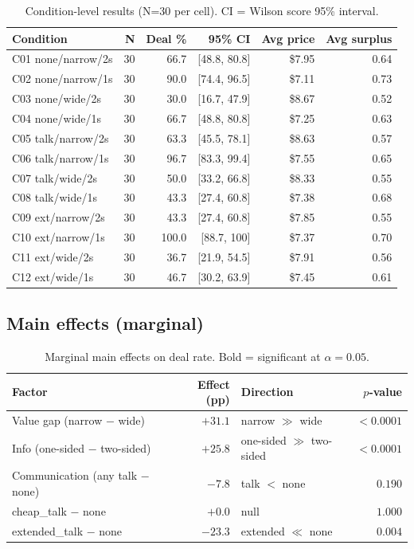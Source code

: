 \documentclass[11pt]{article}
\begin{document}
\begin{table}[htbp]
\centering
\small
\begin{tabularx}{\textwidth}{@{}l r r r r r@{}}
\toprule
\textbf{Condition} & \textbf{N} & \textbf{Deal \%} & \textbf{95\% CI} & \textbf{Avg price} & \textbf{Avg surplus} \\
\midrule
C01 none/narrow/2s & 30 & 66.7 & [48.8, 80.8] & \$7.95 & 0.64 \\
C02 none/narrow/1s & 30 & 90.0 & [74.4, 96.5] & \$7.11 & 0.73 \\
C03 none/wide/2s & 30 & 30.0 & [16.7, 47.9] & \$8.67 & 0.52 \\
C04 none/wide/1s & 30 & 66.7 & [48.8, 80.8] & \$7.25 & 0.63 \\
C05 talk/narrow/2s & 30 & 63.3 & [45.5, 78.1] & \$8.63 & 0.57 \\
C06 talk/narrow/1s & 30 & 96.7 & [83.3, 99.4] & \$7.55 & 0.65 \\
C07 talk/wide/2s & 30 & 50.0 & [33.2, 66.8] & \$8.33 & 0.55 \\
C08 talk/wide/1s & 30 & 43.3 & [27.4, 60.8] & \$7.38 & 0.68 \\
C09 ext/narrow/2s & 30 & 43.3 & [27.4, 60.8] & \$7.85 & 0.55 \\
C10 ext/narrow/1s & 30 & 100.0 & [88.7, 100] & \$7.37 & 0.70 \\
C11 ext/wide/2s & 30 & 36.7 & [21.9, 54.5] & \$7.91 & 0.56 \\
C12 ext/wide/1s & 30 & 46.7 & [30.2, 63.9] & \$7.45 & 0.61 \\
\bottomrule
\end{tabularx}
\caption{Condition-level results (N=30 per cell). CI = Wilson score 95\% interval.}
\label{tab:results-condition}
\end{table}

\subsection{Main effects (marginal)}

\begin{table}[htbp]
\centering
\small
\begin{tabular}{@{}l r l r@{}}
\toprule
\textbf{Factor} & \textbf{Effect (pp)} & \textbf{Direction} & \textbf{$p$-value} \\
\midrule
Value gap (narrow $-$ wide) & $+31.1$ & narrow $\gg$ wide & $< 0.0001$ \\
Info (one-sided $-$ two-sided) & $+25.8$ & one-sided $\gg$ two-sided & $< 0.0001$ \\
Communication (any talk $-$ none) & $-7.8$ & talk $<$ none & $0.190$ \\
\quad cheap\_talk $-$ none & $+0.0$ & null & $1.000$ \\
\quad extended\_talk $-$ none & $-23.3$ & extended $\ll$ none & $\mathbf{0.004}$ \\
\bottomrule
\end{tabular}
\caption{Marginal main effects on deal rate. Bold = significant at $\alpha = 0.05$.}
\label{tab:main-effects}
\end{table}
\end{document}
